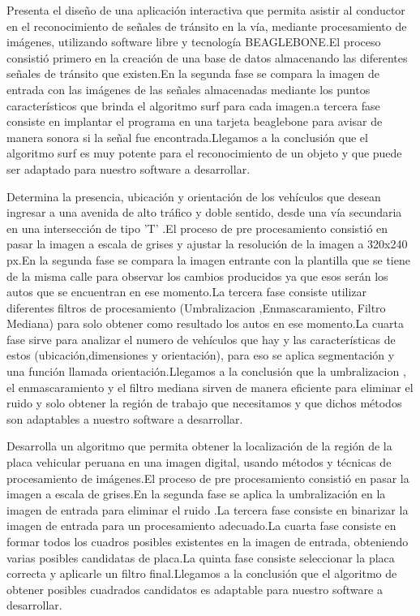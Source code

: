 \documentclass[a4paper, 12pt]{article}
\begin{document}
\vskip 1cm
\citep{caiza2016diseno} Presenta el diseño de una aplicación interactiva que permita asistir al conductor en el reconocimiento de señales de tránsito en la vía, mediante procesamiento de imágenes, utilizando software libre y tecnología BEAGLEBONE.El proceso consistió primero en la creación de una base de datos almacenando las diferentes señales de tránsito que existen.En la segunda fase se compara la imagen de entrada con las imágenes de las señales almacenadas mediante los puntos característicos que brinda el algoritmo surf para cada imagen.a tercera fase consiste en implantar el programa en una tarjeta beaglebone para avisar de manera sonora si la señal fue encontrada.Llegamos a la conclusión que el algoritmo surf es muy potente para el reconocimiento de un objeto y que puede ser adaptado para nuestro software a desarrollar.\par


\vskip 1cm

\citep{ChavezAlex} Determina la presencia, ubicación y orientación de los vehículos que desean ingresar a una avenida de alto tráfico y doble sentido, desde una vía secundaria en una intersección de tipo 'T' .El proceso de pre procesamiento consistió en pasar la imagen a escala de grises y ajustar la resolución de la imagen a 320x240 px.En la segunda fase se compara la imagen entrante con la plantilla que se tiene de la misma calle para observar los cambios producidos ya que esos serán los autos que se encuentran en ese momento.La tercera fase consiste utilizar diferentes filtros de procesamiento (Umbralizacion ,Enmascaramiento, Filtro Mediana) para solo obtener como resultado los autos en ese momento.La cuarta fase sirve para analizar el numero de vehículos que hay y las características de estos (ubicación,dimensiones y orientación), para eso se aplica segmentación y una función llamada orientación.Llegamos a la conclusión que la umbralizacion , el enmascaramiento y el filtro mediana sirven de manera eficiente para eliminar el ruido y solo obtener la región de trabajo que necesitamos y que dichos métodos son adaptables a nuestro software a desarrollar.\par

\vskip 1cm
\citep{salazar2015desarrollo} Desarrolla un algoritmo que permita obtener la localización de la región de la placa vehicular peruana en una imagen digital, usando métodos y técnicas de procesamiento de imágenes.El proceso de pre procesamiento consistió en pasar la imagen a escala de grises.En la segunda fase se aplica la umbralización en la imagen de entrada para eliminar el ruido .La tercera fase consiste en binarizar la imagen de entrada para un procesamiento adecuado.La cuarta fase consiste en formar todos los cuadros posibles existentes en la imagen de entrada, obteniendo varias posibles candidatas de placa.La quinta fase consiste seleccionar la placa correcta y aplicarle un filtro final.Llegamos a la conclusión que el algoritmo de obtener posibles cuadrados candidatos es adaptable para nuestro software a desarrollar.\par
\end{document}
